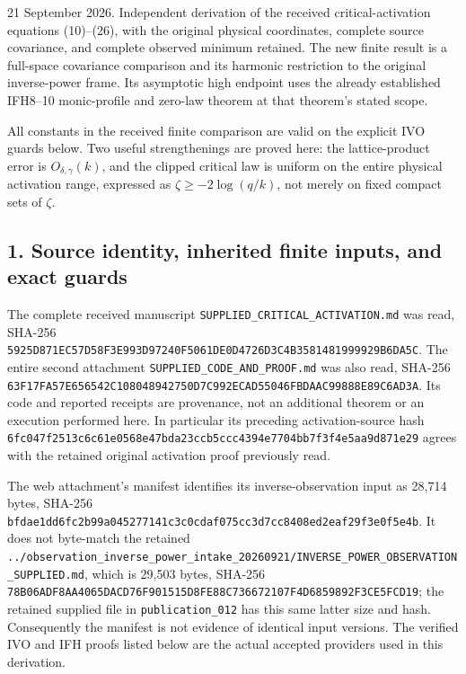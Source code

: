 \documentclass[11pt]{article}
\begin{document}
21 September 2026. Independent derivation of the received critical-activation equations (10)--(26), with the original physical coordinates, complete source covariance, and complete observed minimum retained. The new finite result is a full-space covariance comparison and its harmonic restriction to the original inverse-power frame. Its asymptotic high endpoint uses the already established IFH8--10 monic-profile and zero-law theorem at that theorem's stated scope.

All constants in the received finite comparison are valid on the explicit IVO guards below. Two useful strengthenings are proved here: the lattice-product error is \(O_{\delta,\gamma}(k)\), and the clipped critical law is uniform on the entire physical activation range, expressed as \(\zeta\ge-2\log(q/k)\), not merely on fixed compact sets of \(\zeta\).

\subsection{1. Source identity, inherited finite inputs, and exact guards}\label{source-identity-inherited-finite-inputs-and-exact-guards}

The complete received manuscript \nolinkurl{SUPPLIED_CRITICAL_ACTIVATION.md} was read, SHA-256 \nolinkurl{5925D871EC57D58F3E993D97240F5061DE0D4726D3C4B3581481999929B6DA5C}. The entire second attachment \nolinkurl{SUPPLIED_CODE_AND_PROOF.md} was also read, SHA-256 \nolinkurl{63F17FA57E656542C108048942750D7C992ECAD55046FBDAAC99888E89C6AD3A}. Its code and reported receipts are provenance, not an additional theorem or an execution performed here. In particular its preceding activation-source hash \nolinkurl{6fc047f2513c6c61e0568e47bda23ccb5ccc4394e7704bb7f3f4e5aa9d871e29} agrees with the retained original activation proof previously read.

The web attachment's manifest identifies its inverse-observation input as 28,714 bytes, SHA-256 \nolinkurl{bfdae1dd6fc2b99a045277141c3c0cdaf075cc3d7cc8408ed2eaf29f3e0f5e4b}. It does not byte-match the retained \nolinkurl{../observation_inverse_power_intake_20260921/INVERSE_POWER_OBSERVATION_SUPPLIED.md}, which is 29,503 bytes, SHA-256 \nolinkurl{78B06ADF8AA4065DACD76F901515D8FE88C736672107F4D6859892F3CE5FCD19}; the retained supplied file in \texttt{publication\_012} has this same latter size and hash. Consequently the manifest is not evidence of identical input versions. The verified IVO and IFH proofs listed below are the actual accepted providers used in this derivation.
\end{document}
